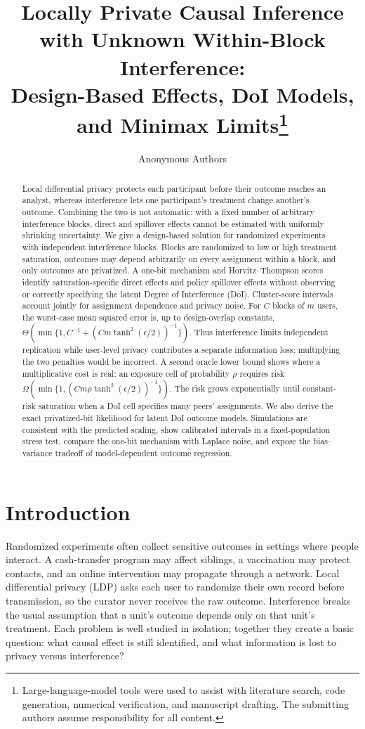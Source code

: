 \documentclass[10pt]{article}
\title{Locally Private Causal Inference with Unknown Within-Block Interference:\\
Design-Based Effects, DoI Models, and Minimax Limits\thanks{Large-language-model tools were
used to assist with literature search, code generation, numerical verification, and manuscript
drafting. The submitting authors assume responsibility for all content.}}
\author{Anonymous Authors}
\date{}
\theoremstyle{definition}
\theoremstyle{remark}
\begin{document}
\maketitle

\begin{abstract}
Local differential privacy protects each participant before their outcome reaches an analyst,
whereas interference lets one participant's treatment change another's outcome. Combining the
two is not automatic: with a fixed number of arbitrary interference blocks, direct and
spillover effects cannot be estimated with uniformly shrinking uncertainty. We give a
design-based solution for randomized
experiments with independent interference blocks. Blocks are randomized to low or high
treatment saturation, outcomes may depend arbitrarily on every assignment within a block,
and only outcomes are privatized. A one-bit mechanism and Horvitz--Thompson scores identify
saturation-specific direct effects and policy spillover effects without observing or correctly
specifying the latent Degree of Interference (DoI). Cluster-score intervals account jointly for
assignment dependence and privacy noise. For $C$ blocks of $m$ users, the worst-case mean
squared error is, up to design-overlap constants,
$\Theta\!\left(\min\{1,C^{-1}+(Cm\tanh^2(\epsilon/2))^{-1}\}\right)$.
Thus interference limits independent replication while user-level privacy contributes a
separate information loss; multiplying the two penalties would be incorrect. A second oracle
lower bound shows where a multiplicative cost is real: an exposure cell of probability $\rho$
requires risk $\Omega(\min\{1,(Cm\rho\tanh^2(\epsilon/2))^{-1}\})$. The risk grows
exponentially until constant-risk saturation when a DoI cell specifies many peers'
assignments. We also derive the exact privatized-bit likelihood for latent DoI outcome models.
Simulations are consistent with the predicted scaling, show calibrated intervals in a
fixed-population stress test, compare the one-bit mechanism with Laplace noise, and expose the
bias--variance tradeoff of model-dependent outcome regression.
\end{abstract}

\section{Introduction}

Randomized experiments often collect sensitive outcomes in settings where people interact.
A cash-transfer program may affect siblings, a vaccination may protect contacts, and an online
intervention may propagate through a network. Local differential privacy (LDP) asks each user
to randomize their own record before transmission, so the curator never receives the raw
outcome. Interference breaks the usual assumption that a unit's outcome depends only on that
unit's treatment. Each problem is well studied in isolation; together they create a basic
question: what causal effect is still identified, and what information is lost to privacy versus
interference?
\end{document}
